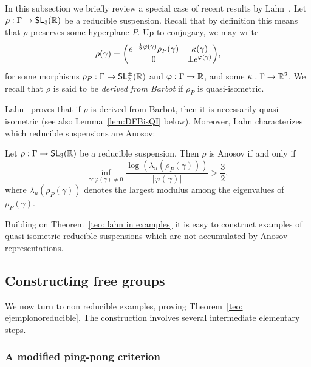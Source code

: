 \documentclass[AHL,Unicode,longabstracts]{cedram}
\DeclareMathOperator{\SL}{\mathsf{SL}}
\newcommand{\R}{\mathbb{R}}
\newcommand{\RR}{\R}
\renewcommand*{\to}{\mathchoice{\longrightarrow}{\rightarrow}{\rightarrow}{\rightarrow}}
\let\originalleft\left
\let\originalright\right
\renewcommand{\left}{\mathopen{}\mathclose\bgroup\originalleft}
\renewcommand{\right}{\aftergroup\egroup\originalright}
\newcommand{\RR}{\mathbb{R}}
\begin{document}
In this subsection we briefly review a special case of recent results by Lahn~\cite{lahn}. Let $\rho:\Gamma\to\SL_3(\R)$ be a reducible suspension. Recall that by definition this means that $\rho$ preserves some hyperplane $P$. Up to conjugacy, we may write
\begin{equation}\label{eq. reducible suspension}
\rho(\gamma)=\left(
\begin{matrix}
e^{-\frac{1}{2}\varphi(\gamma)}\rho_P(\gamma) & \kappa(\gamma)\\
0 & \pm e^{\varphi(\gamma)}
\end{matrix} \right),
\end{equation}
for some morphisms $\rho_P:\Gamma\to\SL_2^\pm(\RR)$ and $\varphi:\Gamma\to\RR$, and some $\kappa:\Gamma\to\RR^2$. We recall that $\rho$ is said to be \emph{derived from Barbot} if $\rho_P$ is quasi-isometric.

Lahn~\cite[Proposition~3.4]{lahn} proves that if $\rho$ is derived from Barbot, then it is necessarily quasi-isometric (see also Lemma~\ref{lem:DFBisQI} below). Moreover, Lahn characterizes which reducible suspensions are Anosov:

\begin{theo}\label{teo: lahn in examples}
Let $\rho:\Gamma\to\SL_3(\R)$ be a reducible suspension.
Then $\rho$ is Anosov if and only if
\[
\inf_{\gamma : \varphi(\gamma)\neq 0}\frac{\log(\lambda_u(\rho_P(\gamma)))}{\vert\varphi(\gamma)\vert}>\frac{3}{2},
\]
where $\lambda_u(\rho_P(\gamma))$ denotes the largest modulus among the eigenvalues of $\rho_P(\gamma)$.
\end{theo}


Building on Theorem~\ref{teo: lahn in examples} it is easy to construct examples of quasi-isometric reducible suspensions which are not accumulated by Anosov representations.


\subsection{Constructing free groups}\label{ss.ZD}

We now turn to non reducible examples, proving Theorem~\ref{teo: ejemplonoreducible}. The construction involves several intermediate elementary steps.

\subsubsection{A modified ping-pong criterion}
\end{document}
